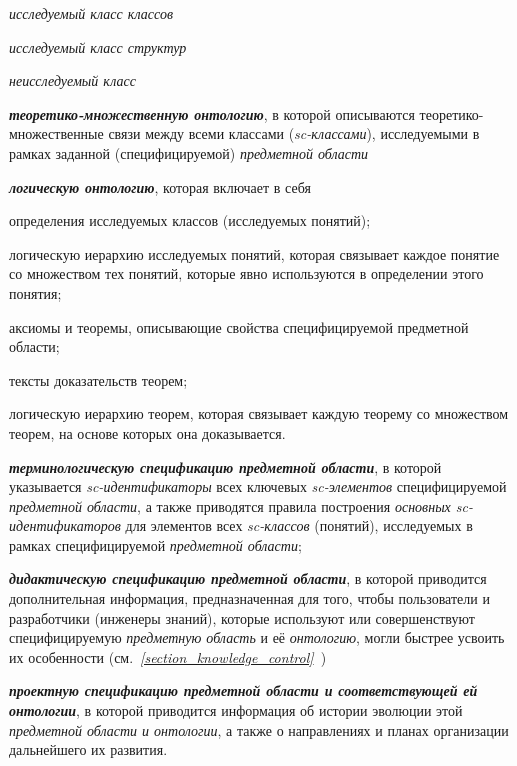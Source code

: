 \begin{textitemize}
\begin{textitemize}
\begin{textitemize}
			\item \textit{исследуемый класс классов\scnrolesign}
			\item \textit{исследуемый класс структур\scnrolesign}
			\item \textit{неисследуемый класс\scnrolesign}
			\begin{SCn}
			\end{SCn}
		\end{textitemize}
		\item \textbf{\textit{теоретико-множественную онтологию}}, в которой описываются теоретико-множественные связи между всеми классами (\textit{sc-классами}), исследуемыми в рамках заданной (специфицируемой) \textit{предметной области}
		\item \textbf{\textit{логическую онтологию}}, которая включает в себя
		\begin{textitemize}
			\item определения исследуемых классов (исследуемых понятий);
			\item логическую иерархию исследуемых понятий, которая связывает каждое понятие со множеством тех понятий, которые явно используются в определении этого понятия;
			\item аксиомы и теоремы, описывающие свойства специфицируемой предметной области;
			\item тексты доказательств теорем;
			\item логическую иерархию теорем, которая связывает каждую теорему со множеством теорем, на основе которых она доказывается.
		\end{textitemize}
		\item \textbf{\textit{терминологическую спецификацию предметной области}}, в которой указывается \textit{sc-идентификаторы} всех ключевых \textit{sc-элементов} специфицируемой \textit{предметной области}, а также приводятся правила построения \textit{основных sc-идентификаторов} для элементов всех \textit{sc-классов} (понятий), исследуемых в рамках специфицируемой \textit{предметной области};
		\item \textbf{\textit{дидактическую спецификацию предметной области}}, в которой приводится дополнительная информация, предназначенная для того, чтобы пользователи и разработчики (инженеры знаний), которые используют или совершенствуют специфицируемую \textit{предметную область} и её \textit{онтологию}, могли быстрее усвоить их особенности (см.~\textit{\ref{section_knowledge_control}~})
		\item \textbf{\textit{проектную спецификацию предметной области и соответствующей ей онтологии}}, в которой приводится информация об истории эволюции этой \textit{предметной области и онтологии}, а также о направлениях и планах организации дальнейшего их развития.
	\end{textitemize}
\end{textitemize}	 

